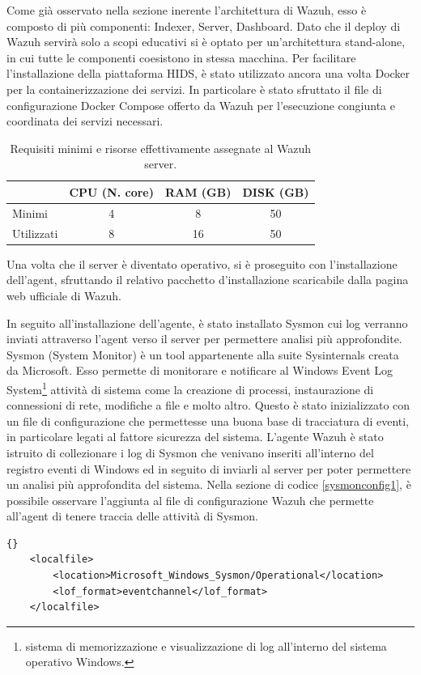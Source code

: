 Come già osservato nella sezione inerente l'architettura di Wazuh, esso è composto di più componenti: Indexer, Server, Dashboard.  Dato che il deploy di Wazuh servirà solo a scopi educativi si è optato per un'architettura stand-alone, in cui tutte le componenti coesistono in stessa macchina. Per facilitare l'installazione della piattaforma HIDS, è stato utilizzato ancora una volta Docker per la containerizzazione dei servizi. In particolare è stato sfruttato il file di configurazione Docker Compose offerto da Wazuh per l'esecuzione congiunta e coordinata dei servizi necessari.

\begin{table}[hbtp]
    \centering
    \begin{tabular}{|l|c|c|c|}
        \hline
        & CPU (N. core) & RAM (GB) & DISK (GB) \\
        \hline
        Minimi     & 4 & 8 & 50   \\
        \hline
        Utilizzati & 8   & 16  & 50 \\
        \hline
    \end{tabular}
    \caption{Requisiti minimi e risorse effettivamente assegnate al Wazuh server.}
    \label{tab:requisitiHwWazuh}
\end{table}



Una volta che il server è diventato operativo, si è proseguito con l'installazione dell'agent, sfruttando il relativo pacchetto d'installazione scaricabile dalla pagina web ufficiale di Wazuh.
\medskip

In seguito all'installazione dell'agente, è stato installato Sysmon cui log verranno inviati attraverso l'agent verso il server per permettere analisi più approfondite. Sysmon \cite{sysmon} (System Monitor) è un tool appartenente alla suite Sysinternals creata da Microsoft. Esso permette di monitorare e notificare al Windows Event Log System\footnote{sistema di memorizzazione e visualizzazione di log all'interno del sistema operativo Windows.} attività di sistema come la creazione di processi, instaurazione di connessioni di rete, modifiche a file e molto altro. Questo è stato inizializzato con un file di configurazione \cite{sysmonconfig} che permettesse una buona base di tracciatura di eventi, in particolare legati al fattore sicurezza del sistema.
L'agente  Wazuh è stato istruito di collezionare i log di Sysmon che venivano inseriti all'interno del registro eventi di Windows ed in seguito di inviarli al server per poter permettere un analisi più approfondita del sistema.
Nella sezione di codice \ref{sysmonconfig1}, è possibile osservare l'aggiunta al file di configurazione Wazuh che permette all'agent di tenere traccia delle attività di Sysmon.
\begin{lstlisting}[floatplacement=H,caption={Aggiunta al file di configurazione dell'agent.},captionpos=b,label={sysmonconfig1}]{}
    <localfile>
        <location>Microsoft_Windows_Sysmon/Operational</location>
        <lof_format>eventchannel</lof_format>
    </localfile>
\end{lstlisting}

